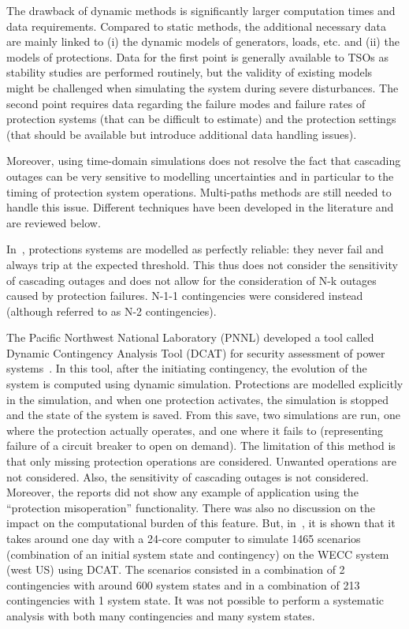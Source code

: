 The drawback of dynamic methods is significantly larger computation times and data requirements. Compared to static methods, the additional necessary data are mainly linked to (i) the dynamic models of generators, loads, etc. and (ii) the models of protections. Data for the first point is generally available to TSOs as stability studies are performed routinely, but the validity of existing models might be challenged when simulating the system during severe disturbances.  The second point requires data regarding the failure modes and failure rates of protection systems (that can be difficult to estimate) and the protection settings (that should be available but introduce additional data handling issues).

Moreover, using time-domain simulations does not resolve the fact that cascading outages can be very sensitive to modelling uncertainties and in particular to the timing of protection system operations. Multi-paths methods are still needed to handle this issue. Different techniques have been developed in the literature and are reviewed below.

In~\cite{SongThesis, SongPaper, Preece1000RandomDynN-2}, protections systems are modelled as perfectly reliable: they never fail and always trip at the expected threshold. This thus does not consider the sensitivity of cascading outages and does not allow for the consideration of N-k outages caused by protection failures. N-1-1 contingencies were considered instead (although referred to as N-2 contingencies).

The Pacific Northwest National Laboratory (PNNL) developed a tool called Dynamic Contingency Analysis Tool (DCAT) for security assessment of power systems~\cite{DCATphase1, DCATphase2}. In this tool, after the initiating contingency, the evolution of the system is computed using dynamic simulation. Protections are modelled explicitly in the simulation, and when one protection activates, the simulation is stopped and the state of the system is saved. From this save, two simulations are run, one where the protection actually operates, and one where it fails to (representing failure of a circuit breaker to open on demand). The limitation of this method is that only missing protection operations are considered. Unwanted operations are not considered. Also, the sensitivity of cascading outages is not considered. Moreover, the reports did not show any example of application using the ``protection misoperation'' functionality. There was also no discussion on the impact on the computational burden of this feature. But, in~\cite{DCAT_2023}, it is shown that it takes around one day with a 24-core computer to simulate 1465 scenarios (combination of an initial system state and contingency) on the WECC system (west US) using DCAT. The scenarios consisted in a combination of 2 contingencies with around 600 system states and in a combination of 213 contingencies with 1 system state. It was not possible to perform a systematic analysis with both many contingencies and many system states.

